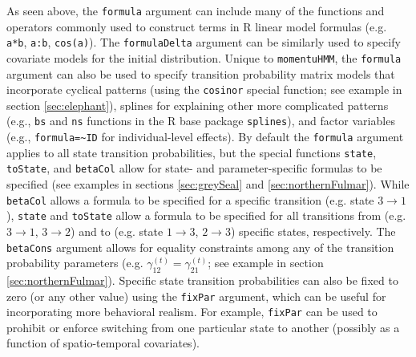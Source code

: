 \documentclass[12pt]{article}\usepackage[]{graphicx}\usepackage[]{color}
\begin{document}
As seen above, the \verb|formula| argument can include many of the functions and operators commonly used to construct terms in R linear model formulas (e.g. \verb|a*b|, \verb|a:b|, \verb|cos(a)|). The \verb|formulaDelta| argument can be similarly used to specify covariate models for the initial distribution.  Unique to \verb|momentuHMM|, the \verb|formula| argument can also be used to specify transition probability matrix models that incorporate cyclical patterns (using the \verb|cosinor| special function; see example in section \ref{sec:elephant}), splines for explaining other more complicated patterns (e.g., \verb|bs| and \verb|ns| functions in the R base package \verb|splines|), and factor variables (e.g., \verb|formula=~ID| for individual-level effects).  By default the \verb|formula| argument applies to all state transition probabilities, but the special functions \verb|state|, \verb|toState|, and \verb|betaCol| allow for state- and parameter-specific formulas to be specified (see examples in sections \ref{sec:greySeal} and \ref{sec:northernFulmar}). While \verb|betaCol| allows a formula to be specified for a specific transition (e.g. state $3 \rightarrow 1$), \verb|state| and \verb|toState| allow a formula to be specified for all transitions from (e.g. $3 \rightarrow 1$, $3 \rightarrow 2$) and to (e.g. state $1 \rightarrow 3$, $2 \rightarrow 3$) specific states, respectively. The \verb|betaCons| argument allows for equality constraints among any of the transition probability parameters (e.g. $\gamma^{(t)}_{12}=\gamma^{(t)}_{21}$; see example in section \ref{sec:northernFulmar}). Specific state transition probabilities can also be fixed to zero (or any other value) using the \verb|fixPar| argument, which can be useful for incorporating more behavioral realism.  For example, \verb|fixPar| can be used to prohibit or enforce switching from one particular state to another (possibly as a function of spatio-temporal covariates). 
\end{document}

